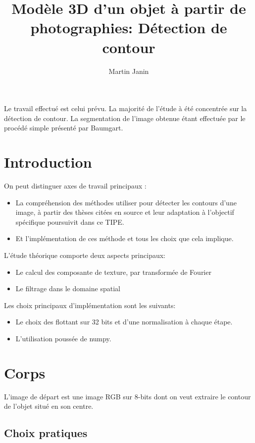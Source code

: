 \documentclass[twocolumn]{article}
\author{Martin Janin}
\title{Modèle 3D d'un objet à partir de photographies: Détection de contour}
\begin{document}
\onecolumn

\maketitle

Le travail effectué est celui prévu. La majorité de l'étude à été concentrée sur la détection de contour. La segmentation de l'image obtenue étant effectuée par le procédé simple présenté par Baumgart.

\tableofcontents

\twocolumn

\section{Introduction}

On peut distinguer axes de travail principaux : 
\begin{itemize}
	\item La compréhension des méthodes utiliser pour détecter les contours d'une image, à partir des thèses citées en source et leur adaptation à l'objectif spécifique poursuivit dans ce TIPE.
	\item Et l'implémentation de ces méthode et tous les choix que cela implique.
\end{itemize}
L'étude théorique comporte deux aspects principaux:
\begin{itemize}
	\item Le calcul des composante de texture, par transformée de Fourier
	\item Le filtrage dans le domaine spatial
\end{itemize}
Les choix principaux d'implémentation sont les suivants:
\begin{itemize}
	\item Le choix des flottant sur 32 bits et d'une normalisation à chaque étape.
	\item L'utilisation poussée de numpy.
\end{itemize}

\section{Corps}

L'image de départ est une image RGB sur 8-bits dont on veut extraire le contour de l'objet situé en son centre.

\subsection{Choix pratiques}
\end{document}
